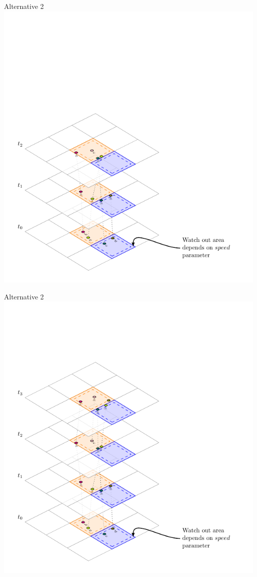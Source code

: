 \documentclass{beamer}
\begin{document}
\begin{frame}{Alternative 2}
    \centering
    \includegraphics[height=0.95\textheight]{Figures/A2/T2}
\end{frame}
\begin{frame}{Alternative 2}
    \centering
    \includegraphics[height=0.95\textheight]{Figures/A2/T3}
\end{frame}
\end{document}
